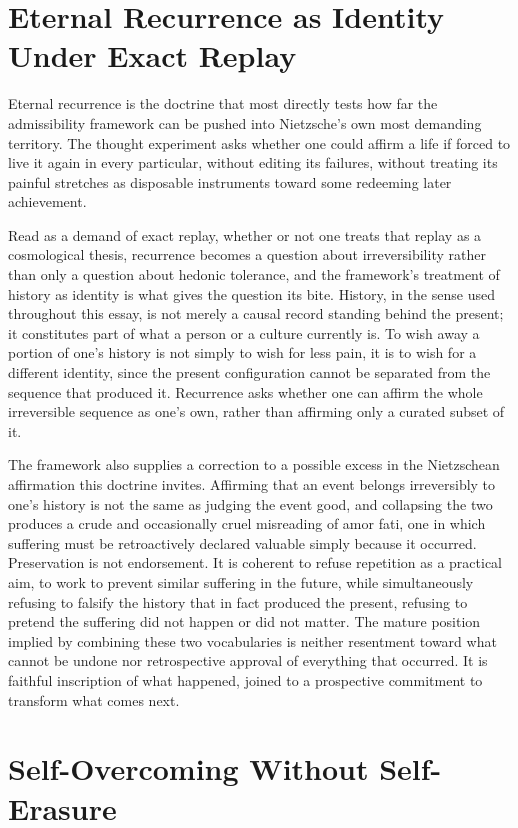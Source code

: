 \documentclass[11pt]{article}
\begin{document}
\section*{Eternal Recurrence as Identity Under Exact Replay}

Eternal recurrence is the doctrine that most directly tests how far the admissibility framework can be pushed into Nietzsche's own most demanding territory. The thought experiment asks whether one could affirm a life if forced to live it again in every particular, without editing its failures, without treating its painful stretches as disposable instruments toward some redeeming later achievement.

Read as a demand of exact replay, whether or not one treats that replay as a cosmological thesis, recurrence becomes a question about irreversibility rather than only a question about hedonic tolerance, and the framework's treatment of history as identity is what gives the question its bite. History, in the sense used throughout this essay, is not merely a causal record standing behind the present; it constitutes part of what a person or a culture currently is. To wish away a portion of one's history is not simply to wish for less pain, it is to wish for a different identity, since the present configuration cannot be separated from the sequence that produced it. Recurrence asks whether one can affirm the whole irreversible sequence as one's own, rather than affirming only a curated subset of it.

The framework also supplies a correction to a possible excess in the Nietzschean affirmation this doctrine invites. Affirming that an event belongs irreversibly to one's history is not the same as judging the event good, and collapsing the two produces a crude and occasionally cruel misreading of amor fati, one in which suffering must be retroactively declared valuable simply because it occurred. Preservation is not endorsement. It is coherent to refuse repetition as a practical aim, to work to prevent similar suffering in the future, while simultaneously refusing to falsify the history that in fact produced the present, refusing to pretend the suffering did not happen or did not matter. The mature position implied by combining these two vocabularies is neither resentment toward what cannot be undone nor retrospective approval of everything that occurred. It is faithful inscription of what happened, joined to a prospective commitment to transform what comes next.

\section*{Self-Overcoming Without Self-Erasure}
\end{document}
